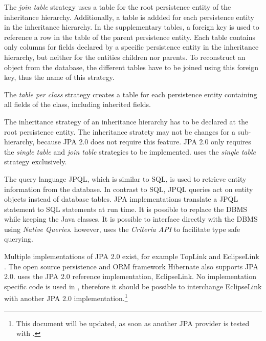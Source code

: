 The \textit{join table} strategy uses a table for the root persistence entity of the inheritance hierarchy.
Additionally, a table is addded for each persistence entity in the inheritance hierarchy.
In the supplementary tables, a foreign key is used to reference a row in the table of the parent persistence entity.
Each table contains only columns for fields declared by a specific persistence entity in the inheritance hierarchy, but neither for the entities children nor parents.
To reconstruct an object from the database, the different tables have to be joined using this foreign key, thus the name of this strategy.

The \textit{table per class} strategy creates a table for each persistence entity containing all fields of the class, including inherited fields.

The inheritance strategy of an inheritance hierarchy has to be declared at the root persistence entity.
The inheritance stratety may not be changes for a sub-hierarchy, because JPA 2.0 does not require this feature.
JPA 2.0 only requires the \textit{single table} and \textit{join table} strategies to be implemented.
\salespoint{} uses the \textit{single table} strategy exclusively.

The query language JPQL, which is similar to SQL, is used to retrieve entity information from the database.
In contrast to SQL, JPQL queries act on entity objects instead of database tables.
JPA implementations translate a JPQL statement to SQL statements at run time.
It is possible to replace the DBMS while keeping the Java classes.
It is possible to interface directly with the DBMS using \textit{Native Queries}.
\salespoint{} however, uses the \textit{Criteria API} \cite{jpa, eclipselink-javadoc} to facilitate type safe querying.

Multiple implementations of JPA 2.0 exist, for example TopLink \cite{toplink} and EclipseLink \cite{eclipselink}.
The open source persistence and ORM framework Hibernate \cite{hibernate} also supports JPA 2.0.
\salespoint{} uses the JPA 2.0 reference implementation, EclipseLink.
No implementation specific code is used in \salespoint{}, therefore it should be possible to interchange EclipseLink with another JPA 2.0 implementation.\footnote{This document will be updated, as soon as another JPA provider is tested with \salespoint{}.}
